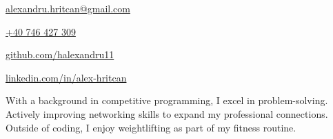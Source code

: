 \documentclass[11pt]{spidercv}
\begin{document}
\begin{TopBar}{\ColorTextSide}

	\begin{DoubleColumns}
		\begin{ItemList}{\ColorHighlight}
			\item [\Large\faAt] \href{mailto:alexandru.hritcan@gmail.com}{alexandru.hritcan@gmail.com}
      \item [\Large\faMobile] \href{tel:+40746427309}{+40 746 427 309}
		\end{ItemList}
		\nextcolumn
		\begin{ItemList}{\ColorHighlight}
			\item [\Large\faGithub] \href{https://github.com/halexandru11}{github.com/halexandru11}
			\item [\Large\faLinkedinSquare] \href{https://www.linkedin.com/in/alex-hritcan}{linkedin.com/in/alex-hritcan}
		\end{ItemList}
	\end{DoubleColumns}


  With a background in competitive programming, I excel in problem-solving.
  Actively improving networking skills to expand my professional connections.
  Outside of coding, I enjoy weightlifting as part of my fitness routine.

\end{TopBar}
\end{document}
